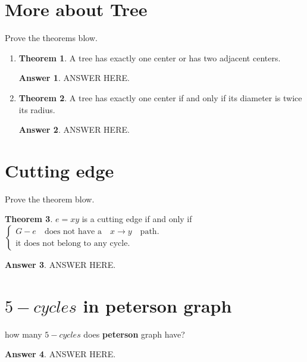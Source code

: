 \documentclass[a4paper]{article}
\renewcommand{\(}{\left(}
\renewcommand{\)}{\right)}
\theoremstyle{plain}
\theoremstyle{plain}
\theoremstyle{definition}
\newtheorem*{answer}{Answer}
\newtheorem{theorem}{Theorem}[section]
\begin{document}
\section{More about Tree}
Prove the theorems blow.
\begin{enumerate}[label=\Roman*]
  \item {
  \begin{theorem}
A tree has exactly one center or has two adjacent centers.
\end{theorem}
\begin{shaded}
\begin{answer}
ANSWER HERE.
\end{answer}
\end{shaded}
}

  \item {
  \begin{theorem}
A tree has exactly one center if and only if its diameter is twice its radius.
\end{theorem}
\begin{shaded}
\begin{answer}
ANSWER HERE.
\end{answer}
\end{shaded}
}
\end{enumerate}

\section{Cutting edge}
Prove the theorem blow.
\begin{theorem}
$e =xy $ is a cutting edge if and only if
 $
\begin{cases}
  G-e \quad \text{does not have a} \quad x \rightarrow y \quad \text{path}. \\
\text{it does not belong to any cycle.}
\end{cases}
$
\end{theorem}
\begin{shaded}
\begin{answer}
ANSWER HERE.
\end{answer}
\end{shaded}

\section{$5-cycles$ in peterson graph}
how many $5-cycles$ does \textbf{peterson} graph have?
\begin{shaded}
\begin{answer}
ANSWER HERE.
\end{answer}
\end{shaded}
\end{document}
